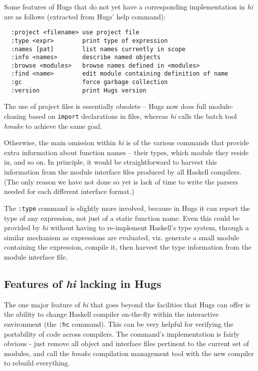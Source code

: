\documentclass[a4paper]{llncs}
\begin{document}
Some features of Hugs that do not yet have a corresponding
implementation in {\em hi} are as follows (extracted from Hugs'
help command):

\begin{verbatim}
  :project <filename> use project file
  :type <expr>        print type of expression
  :names [pat]        list names currently in scope
  :info <names>       describe named objects
  :browse <modules>   browse names defined in <modules>
  :find <name>        edit module containing definition of name
  :gc                 force garbage collection
  :version            print Hugs version
\end{verbatim}

The use of project files is essentially obsolete -- Hugs now does
full module-chasing based on {\tt import} declarations in files,
whereas {\em hi} calls the batch tool {\em hmake} to achieve the
same goal.

Otherwise, the main omission within {\em hi} is of the various
commands that provide extra information about function names --
their types, which module they reside in, and so on.  In principle,
it would be straightforward to harvest this information from the
module interface files produced by all Haskell compilers.  (The only
reason we have not done so yet is lack of time to write the parsers
needed for each different interface format.)

The {\tt :type} command is slightly more involved, because in Hugs
it can report the type of any expression, not just of a static
function name.  Even this could be provided by {\em hi} without
having to re-implement Haskell's type system, through a similar
mechanism as expressions are evaluated, viz. generate a small
module containing the expression, compile it, then harvest the
type information from the module interface file.


\subsection{Features of {\em hi} lacking in Hugs}

The one major feature of {\em hi} that goes beyond the facilities that
Hugs can offer is the ability to change Haskell compiler on-the-fly
within the interactive environment (the {\tt :hc} command).  This can
be very helpful for verifying the portability of code across compilers.
The command's implementation is fairly obvious - just remove all
object and interface files pertinent to the current set of modules,
and call the {\em hmake} compilation management tool with the new
compiler to rebuild everything.
\end{document}
